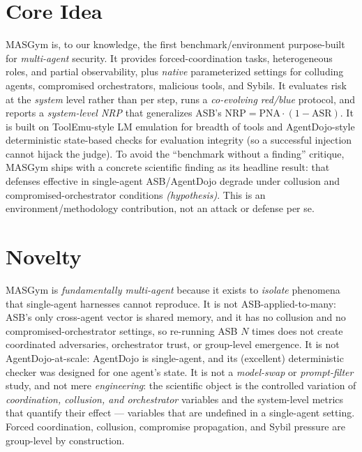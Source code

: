 \documentclass[11pt]{article}
\newcommand{\hyp}{\textit{(hypothesis)}\xspace}
\begin{document}
\section*{Core Idea}
MASGym is, to our knowledge, the first benchmark/environment purpose-built for \emph{multi-agent} security. It provides forced-coordination tasks, heterogeneous roles, and partial observability, plus \emph{native} parameterized settings for colluding agents, compromised orchestrators, malicious tools, and Sybils. It evaluates risk at the \emph{system} level rather than per step, runs a \emph{co-evolving red/blue} protocol, and reports a \emph{system-level NRP} that generalizes ASB's $\mathrm{NRP} = \mathrm{PNA}\cdot(1-\mathrm{ASR})$. It is built on ToolEmu-style LM emulation for breadth of tools and AgentDojo-style deterministic state-based checks for evaluation integrity (so a successful injection cannot hijack the judge). To avoid the ``benchmark without a finding'' critique, MASGym ships with a concrete scientific finding as its headline result: that defenses effective in single-agent ASB/AgentDojo degrade under collusion and compromised-orchestrator conditions \hyp. This is an environment/methodology contribution, not an attack or defense per se.

\section*{Novelty}
MASGym is \emph{fundamentally multi-agent} because it exists to \emph{isolate} phenomena that single-agent harnesses cannot reproduce. It is not ASB-applied-to-many: ASB's only cross-agent vector is shared memory, and it has no collusion and no compromised-orchestrator settings, so re-running ASB $N$ times does not create coordinated adversaries, orchestrator trust, or group-level emergence. It is not AgentDojo-at-scale: AgentDojo is single-agent, and its (excellent) deterministic checker was designed for one agent's state. It is not a \emph{model-swap} or \emph{prompt-filter} study, and not mere \emph{engineering}: the scientific object is the controlled variation of \emph{coordination, collusion, and orchestrator} variables and the system-level metrics that quantify their effect --- variables that are undefined in a single-agent setting. Forced coordination, collusion, compromise propagation, and Sybil pressure are group-level by construction.
\end{document}
